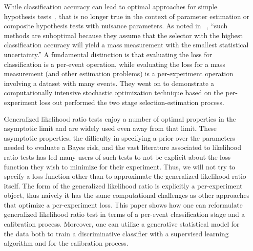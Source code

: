 \documentclass{article} %
\begin{document}
While classification accuracy can lead to optimal approaches for simple hypothesis tests~\cite{Dempster1965}, that is no longer true in the context of parameter estimation or composite hypothesis tests with nuisance parameters. As noted in ~\cite{Whiteson:2006ws}, ``such methods are suboptimal because they assume that the selector with the highest classification accuracy will yield a mass measurement with the smallest statistical uncertainty.''
A fundamental distinction is that evaluating the loss for classification is a per-event operation, while evaluating the loss for a mass measurement (and other estimation problems) is a per-experiment operation involving a dataset with many events. They went on to demonstrate a computationally intensive stochastic optimization technique based on the per-experiment loss out performed the two stage selection-estimation process. 

Generalized likelihood ratio tests enjoy a number of optimal properties in the asymptotic limit and are widely used even away from that limit. These asymptotic properties, the difficulty in specifying a prior over the parameters needed to evaluate a Bayes risk, and the vast literature associated to likelihood ratio tests has led many users of such tests to not be explicit about the loss function they wish to minimize for their experiment. Thus, we will not try to specify a loss function other than to approximate the generalized likelihood ratio itself. The form of the generalized likelihood ratio is explicitly a per-experiment object, thus naively it has the same computational challenges as other approaches that optimize a per-experiment loss. This paper shows how one can reformulate generalized likelihood ratio test in terms of a per-event classification stage and a calibration process. Moreover, one can utilize a generative statistical model for the data both to train a discriminative classifier with a supervised learning algorithm and for the calibration process.

%
\end{document}

